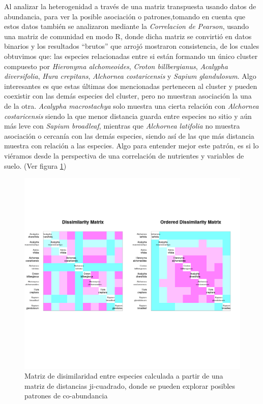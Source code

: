\documentclass[11pt,]{article}
\begin{document}
Al analizar la heterogenidad a través de una matriz transpuesta usando
datos de abundancia, para ver la posible asociación o patrones,tomando
en cuenta que estos datos también se analizaron mediante la
\emph{Correlacion de Pearson}, usando una matriz de comunidad en modo R,
donde dicha matriz se convirtió en datos binarios y los resultados
``brutos'' que arrojó mostraron consistencia, de los cuales obtuvimos
que: las especies relacionadas entre si están formando un único cluster
compuesto por \emph{Hieronyma alchomeoides}, \emph{Croton
billbergianus}, \emph{Acalypha diversifolia}, \emph{Hura crepitans},
\emph{Alchornea costaricensis} y \emph{Sapium glandulosum}. Algo
interesantes es que estas últimas dos mencionadas pertenecen al cluster
y pueden coexistir con las demás especies del cluster, pero no muestran
asociación la una de la otra. \emph{Acalypha macrostachya} solo muestra
una cierta relación con \emph{Alchornea costaricensis} siendo la que
menor distancia guarda entre especies no sitio y aún más leve con
\emph{Sapium broadleaf}, mientras que \emph{Alchornea latifolia} no
muestra asociación o cercanía con las demás especies, siendo así de las
que más distancia muestra con relación a las especies. Algo para
entender mejor este patrón, es si lo viéramos desde la perspectiva de
una correlación de nutrientes y variables de suelo. (Ver figura
\ref{fig:asoc_esp_no_sitio})

\begin{figure}
\centering
\includegraphics{asoc_esp_no_sitio.png}
\caption{\label{fig:asoc_esp_no_sitio} Matriz de disimilaridad entre
especies calculada a partir de una matriz de distancias ji-cuadrado,
donde se pueden explorar posibles patrones de co-abundancia}
\end{figure}
\end{document}

